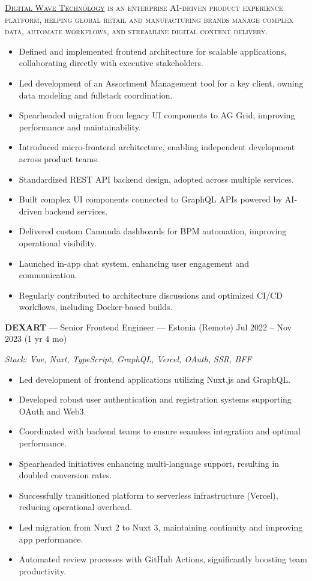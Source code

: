 \documentclass[a4paper,9pt]{article}
\begin{document}
\textsc{\href{https://www.digitalwavetechnology.com/}{Digital Wave Technology} is an enterprise AI-driven product experience platform, helping global retail and manufacturing brands manage complex data, automate workflows, and streamline digital content delivery.}
\begin{itemize}[leftmargin=*]
  \item Defined and implemented frontend architecture for scalable applications, collaborating directly with executive stakeholders.
  \item Led development of an Assortment Management tool for a key client, owning data modeling and fullstack coordination.
  \item Spearheaded migration from legacy UI components to AG Grid, improving performance and maintainability.
  \item Introduced micro-frontend architecture, enabling independent development across product teams.
  \item Standardized REST API backend design, adopted across multiple services.
  \item Built complex UI components connected to GraphQL APIs powered by AI-driven backend services.
  \item Delivered custom Camunda dashboards for BPM automation, improving operational visibility.
  \item Launched in-app chat system, enhancing user engagement and communication.
  \item Regularly contributed to architecture discussions and optimized CI/CD workflows, including Docker-based builds.
\end{itemize}
\vspace{6pt}

\textbf{DEXART} --- Senior Frontend Engineer --- Estonia (Remote) \hfill Jul 2022 -- Nov 2023 (1 yr 4 mo)

\textit{Stack: Vue, Nuxt, TypeScript, GraphQL, Vercel, OAuth, SSR, BFF}
\begin{itemize}[leftmargin=*]
  \item Led development of frontend applications utilizing Nuxt.js and GraphQL.
  \item Developed robust user authentication and registration systems supporting OAuth and Web3.
  \item Coordinated with backend teams to ensure seamless integration and optimal performance.
  \item Spearheaded initiatives enhancing multi-language support, resulting in doubled conversion rates.
  \item Successfully transitioned platform to serverless infrastructure (Vercel), reducing operational overhead.
  \item Led migration from Nuxt 2 to Nuxt 3, maintaining continuity and improving app performance.
  \item Automated review processes with GitHub Actions, significantly boosting team productivity.
\end{itemize}
\vspace{6pt}
\end{document}
